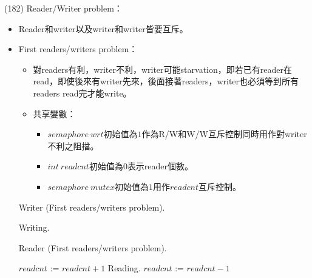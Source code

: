 \begin{theorem}{(182)} Reader/Writer problem：\begin{itemize}
        \item Reader和writer以及writer和writer皆要互斥。
        \item First readers/writers problem：\begin{itemize}
            \item 對readers有利，writer不利，writer可能starvation，即若已有reader在read，即使後來有writer先來，後面接著readers，writer也必須等到所有readers read完才能write。
            \item 共享變數：\begin{itemize}
                \item $semaphore \ wrt$初始值為$1$作為R/W和W/W互斥控制同時用作對writer不利之阻擋。
                \item $int \ readcnt$初始值為$0$表示reader個數。
                \item $semaphore \ mutex$初始值為$1$用作$readcnt$互斥控制。
            \end{itemize}
        \end{itemize}
        \begin{algorithm}[H]
            \caption{Writer (First readers/writers problem).}
            \begin{algorithmic}[1]
                    \Repeat
                        \State {}
                        \State Writing.
                        \State {}
                \EndFunction
            \end{algorithmic}
        \end{algorithm}
        \begin{algorithm}[H]
            \caption{Reader (First readers/writers problem).}
            \begin{algorithmic}[1]
                    \Repeat
                        \State {}
                        \State $readcnt$ := $readcnt + 1$
                         
                            \State {} 
                        \EndIf
                        \State {} 
                        \State Reading.
                        \State {}
                        \State $readcnt$ := $readcnt - 1$
                         

\end{algorithmic}
\end{algorithm}
\end{itemize}
\end{theorem}

